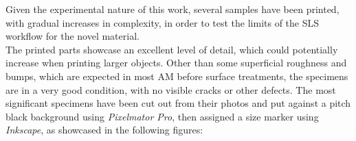 \documentclass{article}
\begin{document}
        Given the experimental nature of this work, several samples have been printed, with gradual 
        increases in complexity, in order to test the limits of the SLS workflow for the novel material. \\ 

        
        The printed parts showcase an excellent level of detail, which could potentially increase when printing larger objects. 
        Other than some superficial roughness and bumps, which are expected
        in most AM before surface treatments, the specimens are in a very good condition, with no visible cracks or other defects.
        The most significant specimens have been cut out from their photos and put against a pitch black background
        using \textit{Pixelmator Pro}, then assigned a size marker using \textit{Inkscape}, 
        as showcased in the following figures: 

\end{document}
